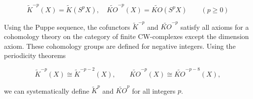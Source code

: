 $$
\tilde{K}^{-p}(X) = \tilde{K}(S^p X), \quad
\widetilde{KO}^{-p}(X) = \widetilde{KO}(S^p X) \qquad (p \geq 0)
$$

Using the Puppe sequence, the cofunctors $\tilde{K}^{-p}$ and $\widetilde{KO}^{-p}$ satisfy all axioms for a cohomology theory on the category of finite CW-complexes except the dimension axiom. These cohomology groups are defined for negative integers. Using the periodicity theorems

$$
\tilde{K}^{-p}(X) \cong \tilde{K}^{-p-2}(X), \qquad
\widetilde{KO}^{-p}(X) \cong \widetilde{KO}^{-p-8}(X),
$$

we can systematically define $\tilde{K}^p$ and $\widetilde{KO}^p$ for all integers $p$.
